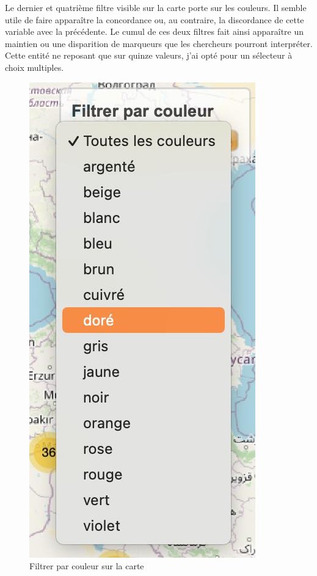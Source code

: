 Le dernier et quatrième filtre visible sur la carte porte sur les couleurs. Il semble utile de faire apparaître la concordance ou, au contraire, la discordance de cette variable avec la précédente. Le cumul de ces deux filtres fait ainsi apparaître un maintien ou une disparition de marqueurs que les chercheurs pourront interpréter. Cette entité ne reposant que sur quinze valeurs, j’ai opté pour un sélecteur à choix multiples.\par

\begin{figure}[H]
	\centering
	\includegraphics[scale=0.3]{./textes/chap2/filtre-couleur.jpg}
	\caption{Filtrer par couleur sur la carte}
	\label{fig:info}
\end{figure}



